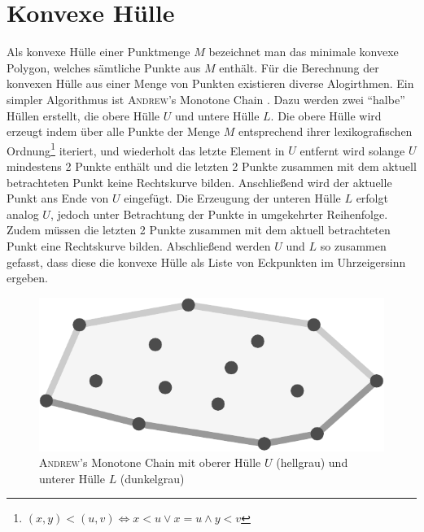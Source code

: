 \section{Konvexe Hülle}
\writtenby{\dcauthornameewie}%
Als konvexe Hülle einer Punktmenge $M$ bezeichnet man das minimale konvexe Polygon, welches sämtliche Punkte aus $M$ enthält.
Für die Berechnung der konvexen Hülle aus einer Menge von Punkten existieren diverse Alogirthmen.
Ein simpler Algorithmus ist \textsc{Andrew}'s Monotone Chain  \cite[6--7]{compgeom2008}.
Dazu werden zwei "`halbe"' Hüllen erstellt, die obere Hülle $U$ und untere Hülle $L$.
Die obere Hülle wird erzeugt indem über alle Punkte der Menge $M$ entsprechend ihrer lexikografischen Ordnung\footnote{
  \( (x,y) < (u, v) \Longleftrightarrow x < u \vee x = u \wedge y < v \)
} iteriert, und wiederholt das letzte Element in $U$ entfernt wird solange $U$ mindestens 2 Punkte enthält und die letzten 2 Punkte zusammen mit dem aktuell betrachteten Punkt keine Rechtskurve bilden.
Anschließend wird der aktuelle Punkt ans Ende von $U$ eingefügt.
Die Erzeugung der unteren Hülle $L$ erfolgt analog $U$, jedoch unter Betrachtung der Punkte in umgekehrter Reihenfolge.
Zudem müssen die letzten 2 Punkte zusammen mit dem aktuell betrachteten Punkt eine Rechtskurve bilden.
Abschließend werden $U$ und $L$ so zusammen gefasst, dass diese die konvexe Hülle als Liste von Eckpunkten im Uhrzeigersinn ergeben.

\begin{figure}[H]
  \centering
  \includegraphics[width=0.5\columnwidth]{img/basics/convex-hull/andrews-monotone-chain}
  \caption[\textsc{Andrew}'s Monotone Chain]{\textsc{Andrew}'s Monotone Chain mit oberer Hülle $U$ (hellgrau) und unterer Hülle $L$ (dunkelgrau)}
\end{figure}
